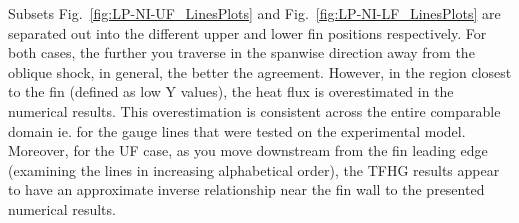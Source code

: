 \documentclass{AIAA}
\begin{document}
Subsets Fig.~\ref{fig:LP-NI-UF_LinesPlots} and Fig.~\ref{fig:LP-NI-LF_LinesPlots} are separated out into the different upper and lower fin positions respectively.
For both cases, the further you traverse in the spanwise direction away from the oblique shock, in general, the better the agreement.
However, in the region closest to the fin (defined as low Y values), the heat flux is overestimated in the numerical results.
This overestimation is consistent across the entire comparable domain ie. for the gauge lines that were tested on the experimental model.
Moreover, for the UF case, as you move downstream from the fin leading edge (examining the lines in increasing alphabetical order), the TFHG results appear to have an approximate inverse relationship near the fin wall to the presented numerical results.
\end{document}
